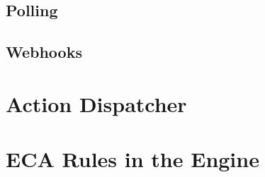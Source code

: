 



\subsection{Polling}


\subsection{Webhooks}







\section{Action Dispatcher}


\section{ECA Rules in the Engine}











